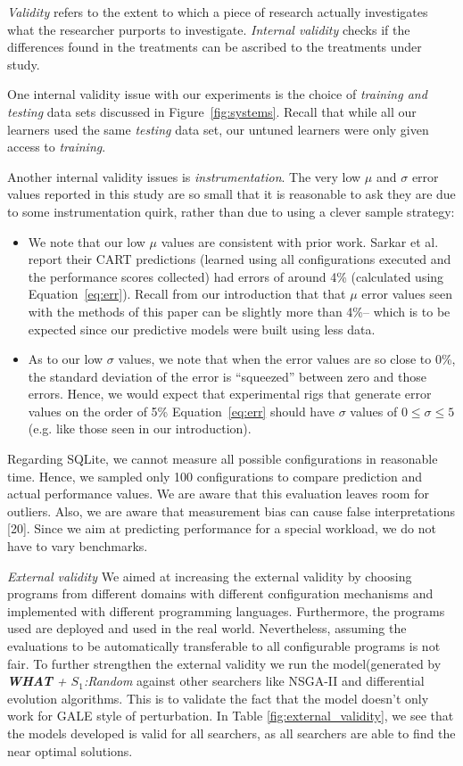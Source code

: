 \documentclass{sig-alternative}
\newcommand{\bi}{\begin{itemize}}%
\newcommand{\ei}{\end{itemize}}
\newcommand{\fig}[1]{Figure~\ref{fig:#1}}
\newcommand{\eq}[1]{Equation~\ref{eq:#1}}
\newcommand{\what}{{\bf WHAT }}
\begin{document}
{\em Validity} refers to the extent to which a piece of research actually
investigates what the researcher purports to investigate.
{\em Internal validity} checks if the differences found in
the treatments can be ascribed to the treatments under study. 

One internal validity issue with our experiments is the choice
of {\em training and testing} data sets discussed in 
\fig{systems}. Recall that while all our learners used the same
{\em testing} data set, our untuned learners were only given
access to {\em training}.

Another internal validity issues is {\em instrumentation}. The very low $\mu$ and $\sigma$ error values
reported in this study are so small that it is reasonable to ask they are due to some instrumentation
quirk, rather than due to using a clever sample strategy:
\bi
\item
We note that our low $\mu$ values are consistent with prior work.  Sarkar et al.~\cite{sarkar2015cost} report their CART predictions
(learned using all configurations executed and the performance scores collected) had  errors of around 4\% (calculated using \eq{err}). Recall from our introduction that that  $\mu$ error values  seen with the methods of this paper
can be slightly more than 4\%-- which is to be expected since our predictive models were built using less
data. 
\item
As to our low $\sigma$ values, we note that when the  error values are so close to 0\%, the standard
deviation of the error is ``squeezed'' between zero and those errors. Hence, we would expect that
experimental rigs
that generate error values on the order of 5\% \eq{err} should have $\sigma$ values of $0\le \sigma \le 5$ (e.g. like those seen in our introduction).
\ei

Regarding SQLite, we cannot measure all possible configurations in reasonable time. Hence, we sampled only 100 configurations to compare prediction and actual performance values. We are aware that this evaluation leaves room for outliers.
Also, we are aware that measurement bias can cause false interpretations [20]. Since we aim at predicting performance for a special workload, we do not have to vary benchmarks.



{\em External validity}  We aimed at increasing the external validity by choosing programs from different domains with different configuration mechanisms and implemented with different programming languages. Furthermore, the programs used are deployed and used in the real world. Nevertheless, assuming the evaluations to be automatically transferable  to all configurable programs is not fair. To further strengthen the external validity we run the model(generated by \textit{\what + $S_1$:Random} against other searchers like NSGA-II and differential evolution algorithms\cite{storn1997differential}. This is to validate the fact that the model doesn't only work for GALE style of perturbation. In Table \ref{fig:external_validity}, we see that the models developed is valid for all searchers, as all searchers are able to find the near optimal solutions.
\end{document}
